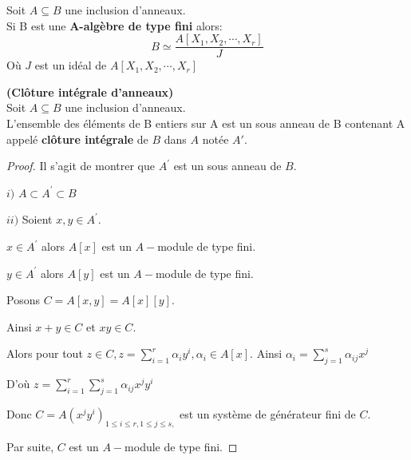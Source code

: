 \begin{maproposition}
	Soit $A \subseteq B$ une inclusion d'anneaux.\\
	Si B est une \textbf{A-algèbre de type fini} alors:
	\[ B \simeq \dfrac{A[X_1, X_2, \cdots, X_r]}{J} \]
	Où $J$ est un idéal de $A[X_1, X_2, \cdots, X_r]$
\end{maproposition}
\begin{moncorollaire}\textbf{(Clôture intégrale d'anneaux)}\cite{Di2}\\
	Soit $A \subseteq B$ une inclusion d'anneaux.\\
	L'ensemble des éléments de B entiers sur A est un sous anneau de B contenant A appelé \textbf{clôture intégrale} de $B$ dans $A$ notée $A'$.
\end{moncorollaire}
\begin{proof}
	Il s'agit de montrer que $A^{\prime }$ est un sous anneau de $B.$
	
	$i)$ $A\subset A^{\prime }\subset B$
	
	$ii)$ Soient $x,y\in A^{\prime }.$
	
	$x\in A^{\prime }$ alors $A[x]$ est un $A-$module de type fini.
	
	$y\in A^{\prime }$ alors $A[y]$ est un $A-$module de type fini.
	
	Posons $C=A[x,y]=A[x][y].$
	
	Ainsi $x+y\in C$ et $xy\in C$.
	
	Alors pour tout $z\in C,z=\sum\limits_{i=1}^{r}\alpha _{i}y^{i},\alpha
	_{i}\in A[x].$ Ainsi $\alpha _{i}=\sum\limits_{j=1}^{s}\alpha _{ij}x^{j}$
	
	D'où $z=\sum\limits_{i=1}^{r}\sum\limits_{j=1}^{s}\alpha _{ij}x^{j}y^{i}$
	
	Donc $C=A(x^{j}y^{i})_{1\leq i\leq r,1\leq j\leq s,}$ est un système de générateur fini de $C.$
	
	Par suite, $C$ est un $A-$module de type fini.
\end{proof}

